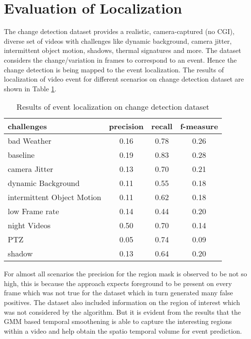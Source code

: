\section{Evaluation of Localization}
\label{sec:EvLoc}
The change detection dataset \citep{cdnet} provides  a realistic, camera-captured (no CGI), diverse set of videos with challenges like dynamic background, camera jitter, intermittent object motion, shadows, thermal signatures and more.  The dataset considers the change/variation in frames to correspond to an event. Hence the change detection is being mapped to the event localization.  The results of localization of video event for different scenarios on change detection dataset are shown in Table \ref{tab:evalLoc}.
\begin{table}[htbp]
   \caption{Results of event localization on change detection dataset}
   \begin{center}
   \begin{tabular}{|l|c|c|c|} \hline
        \textbf{challenges} & \textbf{precision} & \textbf{recall} & \textbf{f-measure} \\ \hline
		bad Weather & 0.16 & 0.78 & 0.26\\
		baseline & 0.19 & 0.83 & 0.28\\
		camera Jitter & 0.13 & 0.70 & 0.21 \\
		dynamic Background & 0.11 & 0.55 &  0.18\\
		intermittent Object Motion & 0.11 & 0.62 & 0.18 \\
		low Frame rate & 0.14 & 0.44 & 0.20 \\
		night Videos & 0.50 & 0.70 & 0.14 \\
		PTZ & 0.05 & 0.74 & 0.09\\
		shadow & 0.13 & 0.64 & 0.20\\ \hline
   \end{tabular}
   \label{tab:evalLoc}
   \end{center}
 \end{table} 
\par For almost all scenarios the precision for the region mask is observed to be not so high, this is because the approach expects foreground to be present on every frame which was not true for the dataset which in turn generated many false positives.  The dataset also included information on the region of interest which was not considered by the algorithm.  But it is evident from the results that the GMM based temporal smoothening is able to capture the interesting regions within a video and help obtain the spatio temporal volume for event prediction.

